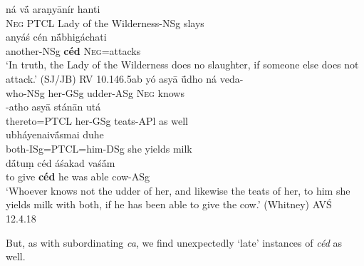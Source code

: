 \documentclass[output=paper,
modfonts
]{LSP/langsci}
\begin{document}
\begin{exe}
\ex
	\begin{xlist}
	\ex\gll ná vā́ araṇyānír hanti \\
			\textsc{Neg} PTCL {Lady of the Wilderness-NSg} slays \\
			
		\gll anyáś cén nā́bhigáchati \\
			another-NSg \textbf{céd} \textsc{Neg}=attacks \\
		\glt `In truth, the Lady of the Wilderness does no slaughter, if someone else does not attack.' (SJ/JB) \hfill {RV 10.146.5ab}
	\ex\gll yó asyā ū́dho ná veda-\\
			who-NSg her-GSg udder-ASg \textsc{Neg} knows \\
			
		\gll -atho asyā stánān utá \\
			thereto=PTCL her-GSg teats-APl {as well} \\
			
		\gll ubháyenaivā́smai duhe \\
			both-ISg=PTCL=him-DSg {she yields milk} \\
			
		\gll dā́tuṃ céd áśakad vaśā́m \\
			{to give} \textbf{céd} {he was able} cow-ASg \\
		\glt `Whoever knows not the udder of her, and likewise the teats of her, to him she yields milk with both, if he has been able to give the cow.' (Whitney) \hfill {AVŚ 12.4.18} \\
	\end{xlist}
\end{exe}

But, as with subordinating \textit{ca}, we find unexpectedly `late' instances of \textit{céd} as well.

\end{document}
